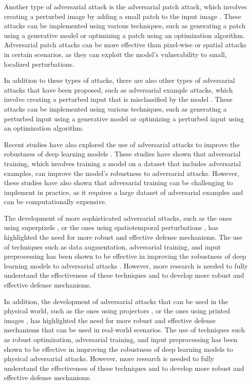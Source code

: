 \documentclass[11pt]{article}
\begin{document}
Another type of adversarial attack is the adversarial patch attack, which involves creating a perturbed image by adding a small patch to the input image \cite{ref35}. These attacks can be implemented using various techniques, such as generating a patch using a generative model or optimizing a patch using an optimization algorithm. Adversarial patch attacks can be more effective than pixel-wise or spatial attacks in certain scenarios, as they can exploit the model's vulnerability to small, localized perturbations.

In addition to these types of attacks, there are also other types of adversarial attacks that have been proposed, such as adversarial example attacks, which involve creating a perturbed input that is misclassified by the model \cite{ref36}. These attacks can be implemented using various techniques, such as generating a perturbed input using a generative model or optimizing a perturbed input using an optimization algorithm.

Recent studies have also explored the use of adversarial attacks to improve the robustness of deep learning models \cite{ref37}. These studies have shown that adversarial training, which involves training a model on a dataset that includes adversarial examples, can improve the model's robustness to adversarial attacks. However, these studies have also shown that adversarial training can be challenging to implement in practice, as it requires a large dataset of adversarial examples and can be computationally expensive.

The development of more sophisticated adversarial attacks, such as the ones using superpixels \cite{ref38}, or the ones using spatiotemporal perturbations \cite{ref39}, has highlighted the need for more robust and effective defense mechanisms. The use of techniques such as data augmentation, adversarial training, and input preprocessing has been shown to be effective in improving the robustness of deep learning models to adversarial attacks \cite{ref40}. However, more research is needed to fully understand the effectiveness of these techniques and to develop more robust and effective defense mechanisms.

In addition, the development of adversarial attacks that can be used in the physical world, such as the ones using projectors \cite{ref41}, or the ones using printed images \cite{ref11}, has highlighted the need for more robust and effective defense mechanisms that can be used in real-world scenarios. The use of techniques such as robust optimization, adversarial training, and input preprocessing has been shown to be effective in improving the robustness of deep learning models to physical adversarial attacks. However, more research is needed to fully understand the effectiveness of these techniques and to develop more robust and effective defense mechanisms.
\end{document}
